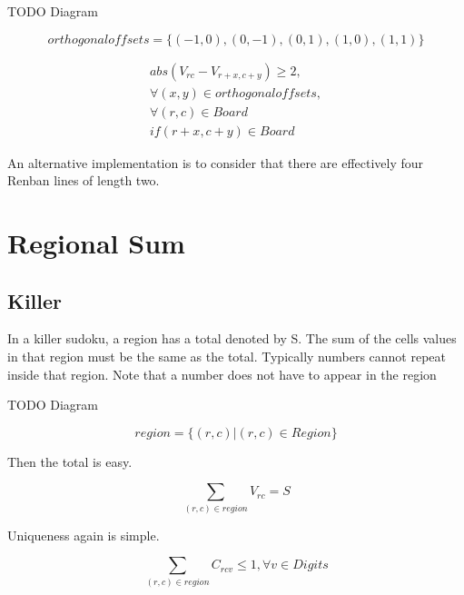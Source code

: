 \documentclass{article}
\begin{document}
TODO Diagram

\begin{equation}
orthogonaloffsets = \lbrace  (-1,0), (0,-1), (0, 1),  (1,0), (1,1) \rbrace
\end{equation}

\begin{equation}
\begin{split}
abs (V_{rc} - V_{r+x,c+y}) \geq 2, \\ 
\forall (x,y) \in orthogonaloffsets, \\ 
\forall (r,c) \in Board \\
 if (r+x, c+y) \in Board
\end{split}
\end{equation}

An alternative implementation is to consider that there are effectively four Renban lines of length two. 


\section{Regional Sum}


\subsection{Killer}

In a killer sudoku, a region has a total denoted by S. The sum of the cells values in that region must be the same as the total.  Typically numbers cannot repeat
inside that region.  Note that a number does not have to appear in the region

TODO Diagram

\begin{equation}
region = \lbrace  (r,c)  | (r,c) \in Region \rbrace
\end{equation}

Then the total is easy. 

\begin{equation}
\sum_{(r,c) \in region} V_{rc} = S
\end{equation}

Uniqueness again is simple. 

\begin{equation}
\sum_{(r,c) \in region} C_{rcv} \leq 1, \forall v\in Digits
\end{equation}
\end{document}
